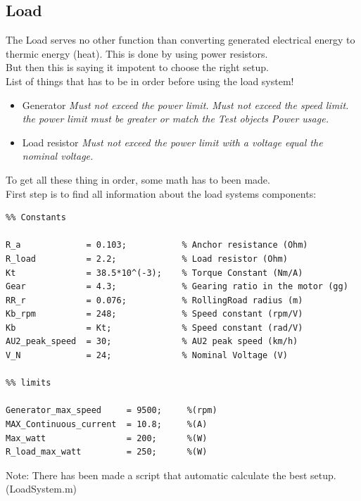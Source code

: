 \subsection{Load}
\label{sec:Loadsystem_load}
The Load serves no other function than converting generated electrical energy to thermic energy (heat). This is done by using power resistors.\\
But then this is saying it impotent to choose the right setup.\\

\large List of things that has to be in order before using the load system!
\begin{itemize}
	\item {Generator}
	\subitem \textit{Must not exceed the power limit.}
	\subitem \textit{Must not exceed the speed limit.}
	\subitem \textit{the power limit must be greater or match the Test objects Power usage.}
	\item {Load resistor}
	\subitem \textit{Must not exceed the power limit with a voltage equal the nominal voltage.}
\end{itemize}

To get all these thing in order, some math has to been made. \\
First step is to find all information about the load systems components: 

\lstset{language=MATLAB}
\begin{lstlisting}
%% Constants

R_a             = 0.103;           % Anchor resistance (Ohm)
R_load          = 2.2;             % Load resistor (Ohm)
Kt              = 38.5*10^(-3);    % Torque Constant (Nm/A)
Gear            = 4.3;             % Gearing ratio in the motor (gg)
RR_r            = 0.076;           % RollingRoad radius (m)
Kb_rpm          = 248;             % Speed constant (rpm/V)
Kb              = Kt;              % Speed constant (rad/V)
AU2_peak_speed  = 30;              % AU2 peak speed (km/h)
V_N             = 24;              % Nominal Voltage (V)

%% limits

Generator_max_speed     = 9500;     %(rpm)
MAX_Continuous_current  = 10.8;     %(A)
Max_watt                = 200;      %(W)
R_load_max_watt         = 250;      %(W)
\end{lstlisting}

Note: There has been made a script that automatic calculate the best setup. (LoadSystem.m)\\
\\

